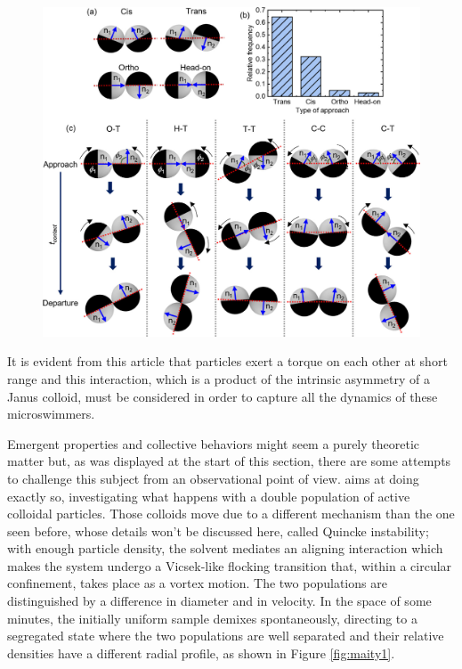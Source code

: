 \documentclass[../../master_thesis_np.tex]{subfiles}
\begin{document}
	\begin{figure}[htp]
		\centering
		\includegraphics[width=\singfigwidth]{singh_pair1.jpeg}
		\caption{\parencite{singh_pair_2024}}
		\label{fig:singh_pair1}
	\end{figure}
	
	It is evident from this article that particles exert a torque on each other at short range and this interaction, which is a product of the intrinsic asymmetry of a Janus colloid, must be considered in order to capture all the dynamics of these microswimmers.
		
	Emergent properties and collective behaviors might seem a purely theoretic matter but, as was displayed at the start of this section, there are some attempts to challenge this subject from an observational point of view. \cite{maity_spontaneous_2023} aims at doing exactly so, investigating what happens with a double population of active colloidal particles. Those colloids move due to a different mechanism than the one seen before, whose details won't be discussed here, called Quincke instability; with enough particle density, the solvent mediates an aligning interaction which makes the system undergo a Vicsek-like flocking transition that, within a circular confinement, takes place as a vortex motion. The two populations are distinguished by a difference in diameter and in velocity. In the space of some minutes, the initially uniform sample demixes spontaneously, directing to a segregated state where the two populations are well separated and their relative densities have a different radial profile, as shown in Figure \ref{fig:maity1}.
	
\end{document}
